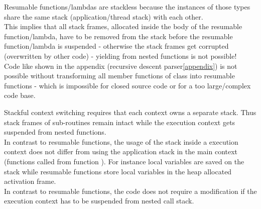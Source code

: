 \label{stackless}
Resumable functions/lambdas are stackless because the instances of those types
share the same stack (application/thread stack) with each other.\\
This implies that all stack frames, allocated inside the body of the resumable
function/lambda, have to be removed from the stack before the resumable
function/lambda is suspended - otherwise the stack frames get corrupted
(overwritten by other code) - yielding from nested functions is not possible!\\
Code like shown in the appendix (recursive descent parser\ref{appendix}) is not
possible without transforming all member functions of class  into
resumable functions - which is impossible for closed source code or for a too
large/complex code base.

Stackful context switching requires that each context owns a separate stack.
Thus stack frames of sub-routines remain intact while the execution context gets
suspended from nested functions.\\
In contrast to resumable functions, the usage of the stack inside a execution
context does not differ from using the application stack in the main context
(functions called from function \main). For instance local variables are saved
on the stack while resumable functions store local variables in the heap
allocated activation frame.\\
In contrast to resumable functions, the code does not require a modification if
the execution context has to be suspended from nested call stack.

